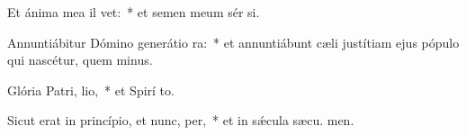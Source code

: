 \item Et ánima mea il vet:~* et semen meum sér si.
\item Annuntiábitur Dómino generátio ra:~* et annuntiábunt cæli justítiam ejus pópulo qui nascétur, quem  minus.
\item Glória Patri,  lio,~* et Spirí to.
\item Sicut erat in princípio, et nunc,  per,~* et in sǽcula sæcu. men.
